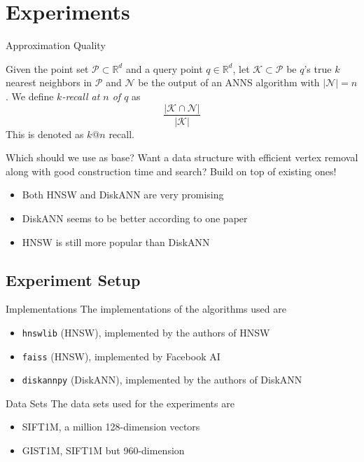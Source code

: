 \section{Experiments}

\begin{frame}{Approximation Quality}
\begin{definition}[Recall]
    Given the point set \(\mathcal{P} \subset \mathbb{R}^d\) and a query point \(q \in \mathbb{R}^d\), let \(\mathcal{K} \subset \mathcal{P}\) be \(q\)'s true \(k\) nearest neighbors in \(\mathcal{P}\) and \(\mathcal{N}\) be the output of an ANNS algorithm with \(|\mathcal{N}| = n\). We define \textit{\(k\)-recall at \(n\) of \(q\)} as
    \[
        \frac{|\mathcal{K} \cap \mathcal{N}|}{|\mathcal{K}|}
    \]
    This is denoted as \(k@n\) recall.
\end{definition}
\end{frame}

\begin{frame}{Which should we use as base?}
    Want a data structure with efficient vertex removal along with good construction time and search? Build on top of existing ones!
    \begin{itemize}
        \item Both HNSW and DiskANN are very promising 
        \item DiskANN seems to be better according to one paper
        \item HNSW is still more popular than DiskANN
    \end{itemize}
\end{frame}

\subsection{Experiment Setup}

\begin{frame}{Implementations}
    The implementations of the algorithms used are
    \begin{itemize}
        \item \texttt{hnswlib} (HNSW), implemented by the authors of HNSW
        \item \texttt{faiss} (HNSW), implemented by Facebook AI
        \item \texttt{diskannpy} (DiskANN), implemented by the authors of DiskANN
    \end{itemize}
\end{frame}

\begin{frame}{Data Sets}
    The data sets used for the experiments are
    \begin{itemize}
        \item SIFT1M, a million 128-dimension vectors
        \item GIST1M, SIFT1M but 960-dimension
    \end{itemize}
\end{frame}

